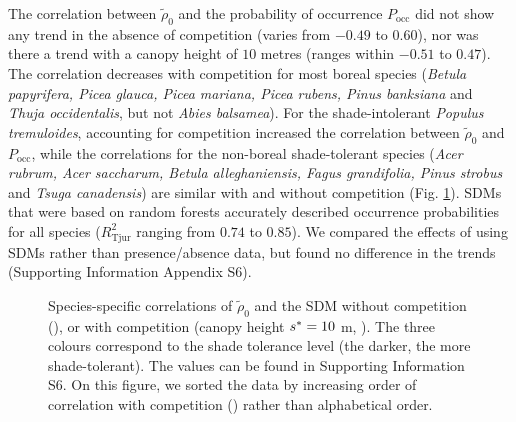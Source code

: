 The correlation between $ \tilde \rho_0 $ and the probability of occurrence $ P_{\text{occ}} $ did not show any trend in the absence of competition (varies from $ - 0.49 $ to $ 0.60 $), nor was there a trend with a canopy height of $ 10 $ metres (ranges within $ - 0.51 $ to $ 0.47 $). The correlation decreases with competition for most boreal species (\textit{Betula papyrifera, Picea glauca, Picea mariana, Picea rubens, Pinus banksiana} and \textit{Thuja occidentalis}, but not \textit{Abies balsamea}). For the shade-intolerant \textit{Populus tremuloides}, accounting for competition increased the correlation between $ \tilde \rho_0 $ and $ P_{\text{occ}} $, while the correlations for the non-boreal shade-tolerant species (\textit{Acer rubrum, Acer saccharum, Betula alleghaniensis, Fagus grandifolia, Pinus strobus} and \textit{Tsuga canadensis}) are similar with and without competition (Fig. \ref{fig::3correls}). SDMs that were based on random forests accurately described occurrence probabilities for all species ($ R_{\text{Tjur}}^2 $ ranging from $ 0.74 $ to $ 0.85 $). We compared the effects of using SDMs rather than presence/absence data, but found no difference in the trends (Supporting Information Appendix S6).
\begin{figure}
	\centering
	
	\caption{Species-specific correlations of $ \tilde \rho_0 $ and the SDM without competition (\MoveUp), or with competition (canopy height $ {s}^{*} = 10 $ m, \CircSteel). The three colours correspond to the shade tolerance level (the darker, the more shade-tolerant). The values can be found in Supporting Information S6. On this figure, we sorted the data by increasing order of correlation with competition (\CircSteel) rather than alphabetical order. \label{fig::3correls}}
\end{figure}

